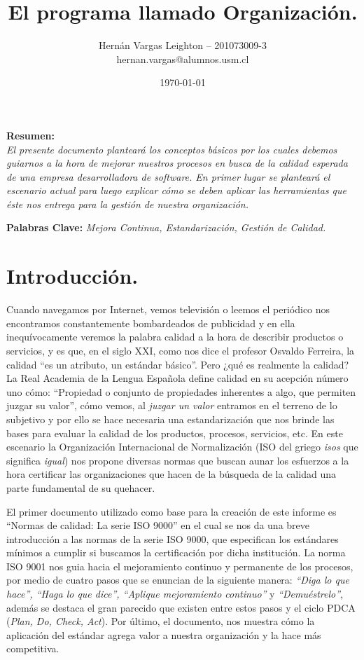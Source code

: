 \documentclass[spanish, fleqn]{article}
\title{El programa llamado Organización.}
\author{Hernán Vargas Leighton -- 201073009-3 \\ hernan.vargas@alumnos.usm.cl}
\date{\today}
\begin{document}
	\maketitle
	\thispagestyle{empty}
	\thispagestyle{fancy}
	\begin{center}
		\begin{minipage}{0.9\textwidth}
			\large \textbf{Resumen:} \\  %
			\emph{El presente documento planteará los conceptos 
			básicos por los cuales debemos guiarnos a la hora de mejorar 
			nuestros procesos en busca de la calidad esperada de una empresa 
			desarrolladora de software. En primer lugar se planteará el
			escenario actual para luego explicar cómo se deben aplicar las
			herramientas que éste nos entrega para la gestión de nuestra
			organización.}
			\begin{flushright}
				\textbf{Palabras Clave:} \emph{Mejora Continua, Estandarización,
				Gestión de Calidad.}
			\end{flushright}
		\end{minipage}
	\end{center}
	\section{Introducción.}
	Cuando navegamos por Internet, vemos televisión o leemos el periódico nos
	encontramos constantemente bombardeados de publicidad y en ella
	inequívocamente veremos la palabra calidad a la hora de describir productos
	o servicios, y es que, en el siglo XXI, como nos dice el profesor Osvaldo 
	Ferreira, la calidad ``es un atributo, un estándar básico''\cite{cle1}.
	Pero ¿qué es realmente la calidad? La Real Academia de la Lengua Española
	define calidad en su acepción número uno cómo: ``Propiedad o conjunto de 
	propiedades inherentes a algo, que permiten juzgar su valor''\cite{raecal},
	cómo vemos, al \emph{juzgar un valor} entramos en el terreno de lo subjetivo
	y por ello se hace necesaria una estandarización que nos brinde las bases
	para evaluar la calidad de los productos, procesos, servicios, etc. 
	En este escenario la Organización Internacional de Normalización (ISO del
	griego \emph{isos} que significa \emph{igual}) nos propone diversas normas
	que buscan aunar los esfuerzos a la hora certificar las organizaciones que
	hacen de la búsqueda de la  calidad una parte fundamental de su quehacer.

	El primer documento utilizado como base para la creación de este informe es
	``Normas de calidad: La serie ISO 9000''\cite{cle1} en el cual se nos da 
	una breve introducción a las normas de la serie ISO 9000, que especifican 
	los estándares mínimos a cumplir si buscamos la certificación por dicha 
	institución. La norma ISO 9001 nos guia hacia el mejoramiento continuo y 
	permanente de los procesos, por medio de cuatro pasos que se enuncian de la
	siguiente manera: \emph{``Diga lo que hace'', ``Haga lo que dice'', 
	``Aplique mejoramiento continuo''} y \emph{``Demuéstrelo''}, además se 
	destaca el gran parecido que existen entre estos pasos y el ciclo PDCA 
	(\emph{Plan, Do, Check, Act}). Por último, el documento, nos muestra cómo la
	aplicación del estándar agrega valor a nuestra organización y la hace más
	competitiva.
\end{document}
